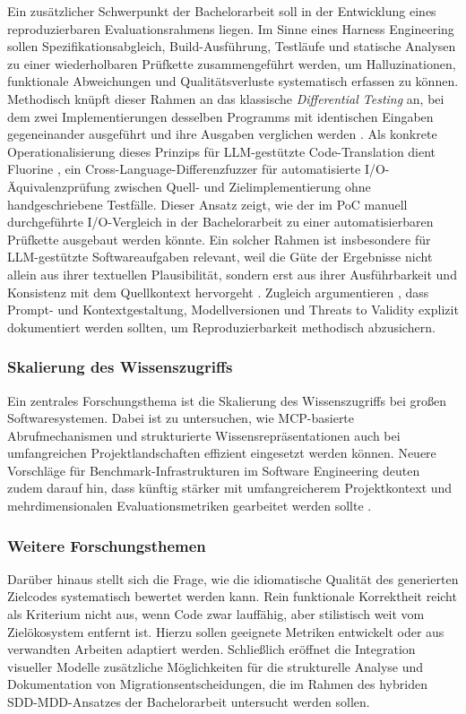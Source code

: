 Ein zusätzlicher Schwerpunkt der Bachelorarbeit soll in der Entwicklung eines reproduzierbaren Evaluationsrahmens liegen. Im Sinne eines Harness Engineering sollen Spezifikationsabgleich, Build-Ausführung, Testläufe und statische Analysen zu einer wiederholbaren Prüfkette zusammengeführt werden, um Halluzinationen, funktionale Abweichungen und Qualitätsverluste systematisch erfassen zu können. Methodisch knüpft dieser Rahmen an das klassische \emph{Differential Testing} an, bei dem zwei Implementierungen desselben Programms mit identischen Eingaben gegeneinander ausgeführt und ihre Ausgaben verglichen werden \parencite{mckeeman1998differentialtesting}. Als konkrete Operationalisierung dieses Prinzips für LLM-gestützte Code-Translation dient Fluorine \parencite{eniser2025realworld}, ein Cross-Language-Differenzfuzzer für automatisierte I/O-Äquivalenzprüfung zwischen Quell- und Zielimplementierung ohne handgeschriebene Testfälle. Dieser Ansatz zeigt, wie der im PoC manuell durchgeführte I/O-Vergleich in der Bachelorarbeit zu einer automatisierbaren Prüfkette ausgebaut werden könnte. Ein solcher Rahmen ist insbesondere für LLM-gestützte Softwareaufgaben relevant, weil die Güte der Ergebnisse nicht allein aus ihrer textuellen Plausibilität, sondern erst aus ihrer Ausführbarkeit und Konsistenz mit dem Quellkontext hervorgeht \parencite{yang2024sweagent,liu2024hallucode}. Zugleich argumentieren \textcite{korn2026reportingprompting}, dass Prompt- und Kontextgestaltung, Modellversionen und Threats to Validity explizit dokumentiert werden sollten, um Reproduzierbarkeit methodisch abzusichern.

\subsubsection{Skalierung des Wissenszugriffs}

Ein zentrales Forschungsthema ist die Skalierung des Wissenszugriffs bei großen Softwaresystemen. Dabei ist zu untersuchen, wie MCP-basierte Abrufmechanismen und strukturierte Wissensrepräsentationen auch bei umfangreichen Projektlandschaften effizient eingesetzt werden können. Neuere Vorschläge für Benchmark-Infrastrukturen im Software Engineering deuten zudem darauf hin, dass künftig stärker mit umfangreicherem Projektkontext und mehrdimensionalen Evaluationsmetriken gearbeitet werden sollte \parencite{rodriguezcardenas2026behelm}.

\subsubsection{Weitere Forschungsthemen}

Darüber hinaus stellt sich die Frage, wie die idiomatische Qualität des generierten Zielcodes systematisch bewertet werden kann. Rein funktionale Korrektheit reicht als Kriterium nicht aus, wenn Code zwar lauffähig, aber stilistisch weit vom Zielökosystem entfernt ist. Hierzu sollen geeignete Metriken entwickelt oder aus verwandten Arbeiten adaptiert werden. Schließlich eröffnet die Integration visueller Modelle zusätzliche Möglichkeiten für die strukturelle Analyse und Dokumentation von Migrationsentscheidungen, die im Rahmen des hybriden SDD-MDD-Ansatzes der Bachelorarbeit untersucht werden sollen.
